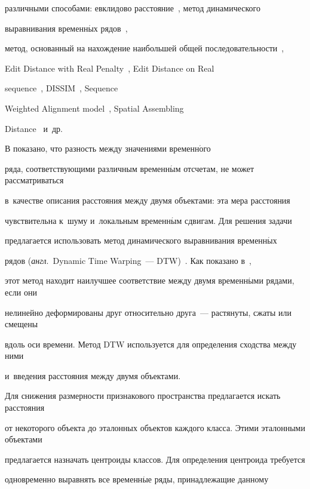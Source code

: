 различными способами: евклидово расстояние~\cite{Faloutsos1994}, метод динамического 

выравнивания временн$\acute{\mbox{ы}}$х рядов~\cite{Berndt1994,Keogh2005Exact}, 

метод, основанный на нахождение наибольшей общей последовательности~\cite{Vlachos2002discovering}, 

Edit Distance with Real Penalty~\cite{Chen2004On}, Edit Distance on Real 

sequence~\cite{Chen2005Robust}, DISSIM~\cite{Frentzos2007Index}, Sequence 

Weighted Alignment model~\cite{Morse2007An}, Spatial Assembling 

Distance~\cite{Chen2007Spade} и~др.



В \cite{Ding} показано, что разность между значениями временн$\acute{\mbox{о}}$го 

ряда, соответствующими различным временн$\acute{\mbox{ы}}$м отсчетам, не может рассматриваться 

в~качестве описания расстояния между двумя объектами: эта мера расстояния 

чувствительна к~шуму и~локальным временн$\acute{\mbox{ы}}$м сдвигам. Для решения задачи 

предлагается использовать метод динамического выравнивания временн$\acute{\mbox{ы}}$х 

рядов (\textit{англ}.\ Dynamic Time Warping~--- DTW)~\cite{Keogh}. Как показано в~\cite{Salvador}, 

этот метод находит наилучшее соответствие между двумя временн$\acute{\mbox{ы}}$ми рядами, если они 

нелинейно деформированы друг относительно друга~--- растянуты, сжаты или смещены 

вдоль оси времени. Метод DTW используется для определения сходства между ними 

и~введения расстояния между двумя объектами.



Для снижения размерности признакового пространства предлагается искать расстояния 

от некоторого объекта до эталонных объектов каждого класса. Этими эталонными объектами 

предлагается назначать центроиды классов. Для определения центроида требуется 

одновременно выравнять все временн$\acute{\mbox{ы}}$е ряды, принадлежащие данному 

